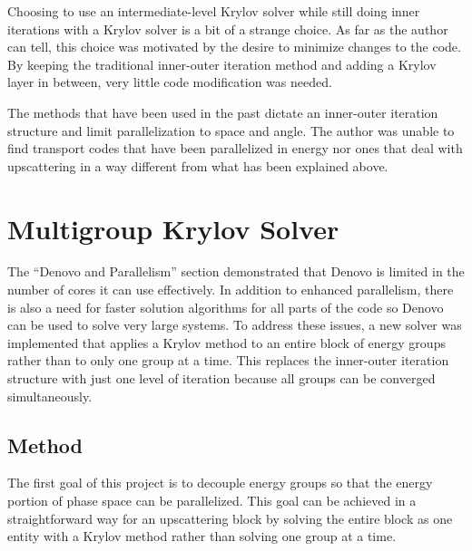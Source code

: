 Choosing to use an intermediate-level Krylov solver while still doing inner iterations with a Krylov solver is a bit of a strange choice. As far as the author can tell, this choice was motivated by the desire to minimize changes to the code. By keeping the traditional inner-outer iteration method and adding a Krylov layer in between, very little code modification was needed. 

The methods that have been used in the past dictate an inner-outer iteration structure and limit parallelization to space and angle. The author was unable to find transport codes that have been parallelized in energy nor ones that deal with upscattering in a way different from what has been explained above. 

\section{Multigroup Krylov Solver}
The ``Denovo and Parallelism'' section demonstrated that Denovo is limited in the number of cores it can use effectively. In addition to enhanced parallelism, there is also a need for faster solution algorithms for all parts of the code so Denovo can be used to solve very large systems. To address these issues, a new solver was implemented that applies a Krylov method to an entire block of energy groups rather than to only one group at a time. This replaces the inner-outer iteration structure with just one level of iteration because all groups can be converged simultaneously. 

\subsection{Method}
The first goal of this project is to decouple energy groups so that the energy portion of phase space can be parallelized. This goal can be achieved in a straightforward way for an upscattering block by solving the entire block as one entity with a Krylov method rather than solving one group at a time. 

